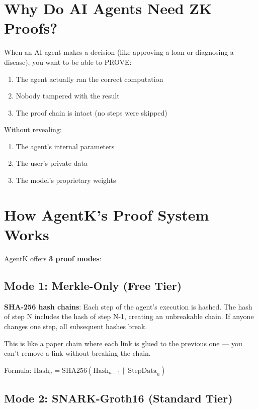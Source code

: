 \documentclass[12pt,a4paper,openany]{report}
\begin{document}
\section{Why Do AI Agents Need ZK Proofs?}

When an AI agent makes a decision (like approving a loan or diagnosing a disease), you want to be able to PROVE:
\begin{enumerate}
    \item The agent actually ran the correct computation
    \item Nobody tampered with the result
    \item The proof chain is intact (no steps were skipped)
\end{enumerate}

Without revealing:
\begin{enumerate}
    \item The agent's internal parameters
    \item The user's private data
    \item The model's proprietary weights
\end{enumerate}

\section{How AgentK's Proof System Works}

AgentK offers \textbf{3 proof modes}:

\subsection{Mode 1: Merkle-Only (Free Tier)}

\begin{keyconceptbox}
\textbf{SHA-256 hash chains}: Each step of the agent's execution is hashed. The hash of step N includes the hash of step N-1, creating an unbreakable chain. If anyone changes one step, all subsequent hashes break.

This is like a paper chain where each link is glued to the previous one — you can't remove a link without breaking the chain.
\end{keyconceptbox}

Formula: $\text{Hash}_n = \text{SHA256}(\text{Hash}_{n-1} \| \text{StepData}_n)$

\subsection{Mode 2: SNARK-Groth16 (Standard Tier)}
\end{document}
